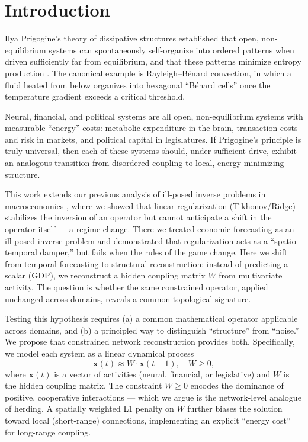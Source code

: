 \documentclass[11pt,a4paper]{article}
\begin{document}
\section{Introduction}

Ilya Prigogine's theory of dissipative structures established that open, non-equilibrium systems can spontaneously self-organize into ordered patterns when driven sufficiently far from equilibrium, and that these patterns minimize entropy production \cite{prigogine1977}. The canonical example is Rayleigh--Bénard convection, in which a fluid heated from below organizes into hexagonal ``Bénard cells'' once the temperature gradient exceeds a critical threshold.

Neural, financial, and political systems are all open, non-equilibrium systems with measurable ``energy'' costs: metabolic expenditure in the brain, transaction costs and risk in markets, and political capital in legislatures. If Prigogine's principle is truly universal, then each of these systems should, under sufficient drive, exhibit an analogous transition from disordered coupling to local, energy-minimizing structure.

This work extends our previous analysis of ill-posed inverse problems in macroeconomics \cite{avtonomov2026}, where we showed that linear regularization (Tikhonov/Ridge) stabilizes the inversion of an operator but cannot anticipate a shift in the operator itself --- a regime change. There we treated economic forecasting as an ill-posed inverse problem and demonstrated that regularization acts as a ``spatio-temporal damper,'' but fails when the rules of the game change. Here we shift from temporal forecasting to structural reconstruction: instead of predicting a scalar (GDP), we reconstruct a hidden coupling matrix $W$ from multivariate activity. The question is whether the same constrained operator, applied unchanged across domains, reveals a common topological signature.

Testing this hypothesis requires (a) a common mathematical operator applicable across domains, and (b) a principled way to distinguish ``structure'' from ``noise.'' We propose that constrained network reconstruction provides both. Specifically, we model each system as a linear dynamical process
\begin{equation}
    \mathbf{x}(t) \approx W \cdot \mathbf{x}(t-1), \quad W \ge 0,
\end{equation}
where $\mathbf{x}(t)$ is a vector of activities (neural, financial, or legislative) and $W$ is the hidden coupling matrix. The constraint $W \ge 0$ encodes the dominance of positive, cooperative interactions --- which we argue is the network-level analogue of herding. A spatially weighted L1 penalty on $W$ further biases the solution toward local (short-range) connections, implementing an explicit ``energy cost'' for long-range coupling.
\end{document}
